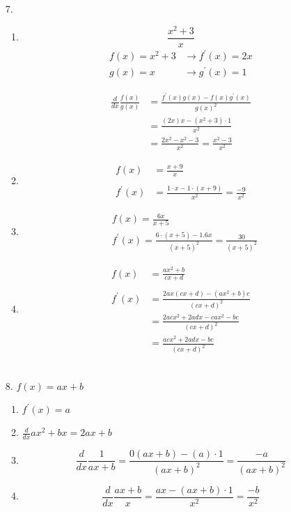 \documentclass{./../../Latex/homework}
\begin{document}
\begin{enumerate}
\item[7.] \begin{enumerate} \item $$\frac{x^{2}+3}{x} $$ 
$$
\begin{array}{ll}
f(x)=x^{2}+3 & \rightarrow f^{\prime}(x)=2 x \\
g(x)=x & \rightarrow g^{\prime}(x)=1
\end{array}
$$ 

$$
\begin{aligned}
\frac{d}{d x} \frac{f(x)}{g(x)} &=\frac{f^{\prime}(x) g(x)-f(x) g^{\prime}(x)}{g(x)^{2}} \\
&=\frac{(2 x) x-\left(x^{2}+3\right) \cdot 1}{x^{2}} \\
&=\frac{2 x^{2}-x^{2}-3}{x^{2}}=\frac{x^{2}-3}{x^{2}}
\end{aligned}
$$ 

\item
$$
\begin{aligned}
f(x) &=\frac{x+9}{x} \\~\\
f^{\prime}(x) &=\frac{1 \cdot x-1 \cdot(x+9)}{x^{2}}=\frac{-9}{x^{2}}
\end{aligned}
$$ 

\item
$$
\begin{aligned}
&f(x)=\frac{6 x}{x+5} \\
&f^{\prime}(x)=\frac{6 \cdot(x+5)-1.6 x}{(x+5)^{2}}=\frac{30}{(x+5)^{2}}
\end{aligned}
$$ 

\item
$$
\begin{aligned}
f(x) &=\frac{a x^{2}+b}{c x+d} \\~\\
f^{\prime}(x) &=\frac{2 a x(c x+d)-\left(a x^{2}+b\right) c}{(c x+d)^{2}} \\
&=\frac{2 a c x^{2}+2 a d x-c a x^{2}-b c}{(c x+d)^{2}} \\
&= \frac{a c x^{2}+2 a d x-b c}{(c x+d)^{2}}
\end{aligned}
$$ \\
\end{enumerate}

\item[8.]
 $f(x)=a x+b$ 
\begin{enumerate}
\item $f^{\prime}(x)=a$ 
\item $\frac{d}{d x} a x^{2}+b x=2 a x+b$ 
\item $$\frac{d}{d x} \frac{1}{a x+b}=\frac{0(a x+b)-(a) \cdot 1}{(a x+b)^{2}}=\frac{-a}{(a x+b)^{2}}$$ 
\item $$\frac{d}{d x} \frac{a x+b}{x}=\frac{a x-(a x+b) \cdot 1}{x^{2}}=\frac{-b}{x^{2}}$$ 
\end{enumerate}

\end{enumerate}
\end{document}
